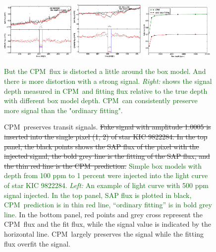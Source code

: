 \documentclass[12pt, preprint]{aastex}
\newcommand{\name}{CPM}
\newcommand{\revise}[1]{\textcolor{darkgreen}{#1}}
\newcommand{\remove}[1]{\sout{#1}}
\begin{document}
\begin{figure}[p]
\begin{center}
\includegraphics[width=0.32\textwidth]{f4a}
\includegraphics[width=0.32\textwidth]{f4b}
\includegraphics[width=0.32\textwidth]{f4c}
\end{center}
\caption{
  \label{distortion} 
  \name\ preserves transit signals.
  \remove{Fake signal with amplitude 1.0005 is inserted into the single pixel (1, 2) of star KIC 9822284.
  In the top panel, the black points shows the SAP flux of the pixel with the injected signal, the bold grey line is the fitting of the SAP flux, and the thin red line is the \name\ prediction.}
  \revise{Simple box models with depth from 100 ppm to 1 percent were injected into the light curve of star KIC 9822284. \emph{Left:} An example of light curve with 500 ppm signal injected. In the top panel, SAP flux is plotted in black, 
    \name\ prediction is in thin red line, 
   ``ordinary fitting'' is in bold grey line.} 
  In the bottom panel, red points and grey cross represent the \name\ flux and the fit flux, while the signal value is indicated by the horizontal line. 
  \name\ largely preserves the signal while the fitting flux overfit the signal.} \revise{But the \name\ flux is distorted a little around the box model. 
  And there is more distortion with a strong signal.
  \emph{Right:} shows the signal depth measured in \name\ and fitting flux relative to the true depth with different box model depth. \name\ can consistently preserve more signal than the "ordinary fitting".}
\end{figure}
\end{document}
